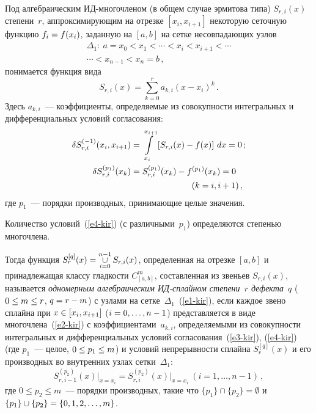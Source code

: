 \begin{multicols}{2}
  Под  алгебраическим ИД-многочленом (в общем 
случае эрмитова типа) $S_{r,i}(x)$ степени~$r$, аппроксимирующим на отрезке 
$[x_i,x_{i+1}]$ некоторую сеточную функцию $f_i\hm=f(x_i)$, заданную на 
$[a,b]$ на сетке несовпадающих узлов
  \begin{multline}
  \Delta_1:\ a=x_0<x_1<\cdots < x_i<x_{i+1}<\cdots \\
{}  \cdots< x_{n-1}<x_n=b\,,
  \label{e1-kir}
  \end{multline}
понимается функция вида 
\begin{equation}
S_{r,i}(x)=\sum\limits_{k=0}^r a_{k,i}(x-x_i)^k\,.
\label{e2-kir}
\end{equation}
  Здесь $a_{k,i}$~--- коэффициенты, определяемые из совокупности 
интегральных и дифференциальных условий согласования:
  \begin{align}
  \delta S_{r,i}^{(-1)}(x_i,x_{i+1}) &= \int\limits_{x_i}^{x_{i+1}} \left[ 
S_{r,i}(x) - f(x)\right]\,dx =0\,;\label{e3-kir}\\
  \delta S_{r,i}^{(p_1)}(x_k) &= S_{r,i}^{(p_1)}(x_k) -f^{(p_1)}(x_k) =0\notag\\ 
&\hspace*{25mm}(k=i,i+1)\,,\label{e4-kir}
  \end{align}
где $p_1$~--- порядки производных, принимающие целые значения.

  Количество условий~(\ref{e4-kir}) (с различными~$p_1$) определяются 
степенью многочлена.
  
  Тогда функция $S_r^{[q]}(x)\hm= \mathop{\cup}\limits_{i=0}^{n-1} S_{r,i}(x)$, 
определенная на отрезке $[a,b]$ и принадлежащая классу гладкости 
$C^m_{[a,b]}$, составленная из звеньев $S_{r,i}(x)$, называется 
\textit{одномерным алгебраическим ИД-сплайном 
степени~$r$ дефекта}~$q$ ($0\hm\leq m\hm\leq r$, $q\hm=r\hm-m$) с узлами на 
сетке~$\Delta_1$~(\ref{e1-kir}), если каждое звено сплайна при $x\hm\in 
[x_i,x_{i+1}]$ ($i\hm=0, \ldots , n-1$) представляется в виде 
многочлена~(\ref{e2-kir}) с коэффициентами~$a_{k,i}$, определяемыми из 
совокупности интегральных и дифференциальных условий 
согласования~(\ref{e3-kir}), (\ref{e4-kir}) (где $p_1$~--- целое, $0\hm\leq 
p_1\hm\leq m$) и условий непрерывности сплайна $S_r^{[q]}(x)$ и его 
производных во внутренних узлах сетки~$\Delta_1$:
  $$
  S_{r,i-1}^{(p_2)}(x)\big\vert_{x=x_i} = S_{r,i}^{(p_2)}(x)\big\vert_{x=x_i}\ 
(i=1,\ldots, n-1)\,,
  $$ 
где $0\leq p_2\leq m$~--- порядки производных, такие что $\{p_1\}\cap 
\{p_2\}=\emptyset$ и $\{p_1\}\cup\{p_2\}\hm=\{0,1,2, \ldots ,m\}$.
  

\end{multicols}
